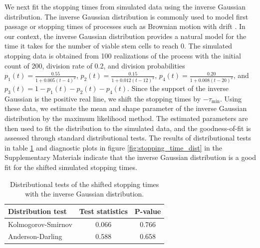 \documentclass[pdflatex,sn-mathphys-num]{sn-jnl}
\theoremstyle{thmstyleone}%
\theoremstyle{thmstyletwo}%
\theoremstyle{thmstylethree}%
\begin{document}
We next fit the stopping times from simulated data using the inverse Gaussian distribution. The inverse Gaussian distribution is commonly used to model first passage or stopping times of processes such as Brownian motion with drift \cite{folks1978inverse}. In our context, the inverse Gaussian distribution provides a natural model for the time it takes for the number of viable stem cells to reach 0. The simulated stopping data is obtained from 100 realizations of the process with the initial count of 200, division rate of 0.2, and division probabilities $p_1(t) = \frac{0.55}{1 + 0.005(t-4)^2}$, $p_2(t) = \frac{0.15}{1 + 0.012(t-12)^2}$, $p_4(t) = \frac{0.20}{1+0.008(t-20)^2}$, and $p_3(t) = 1-p_1(t)-p_2(t)-p_4(t)$. Since the support of the inverse Gaussian is the positive real line, we shift the stopping times by $-\tau_{\min}$. Using these data, we estimate the mean and shape parameter of the inverse Gaussian distribution by the maximum likelihood method. The estimated parameters are then used to fit the distribution to the simulated data, and the goodness-of-fit is assessed through standard distributional tests. The results of distributional tests in table \ref{tab:stopping_time_dist} and diagnostic plots in figure \ref{fig:stopping_time_dist} in the Supplementary Materials indicate that the inverse Gaussian distribution is a good fit for the shifted simulated stopping times.
\begin{table}[h]
    \centering
    \begin{tabular}{lcc}
        \toprule
        Distribution test & Test statistics & P-value \\
        \midrule
        Kolmogorov-Smirnov & 0.066 & 0.766 \\
        Anderson-Darling & 0.588 & 0.658 \\
        \bottomrule
    \end{tabular}
    \caption{Distributional tests of the shifted stopping times with the inverse Gaussian distribution.}
    \label{tab:stopping_time_dist}
\end{table}
\end{document}
